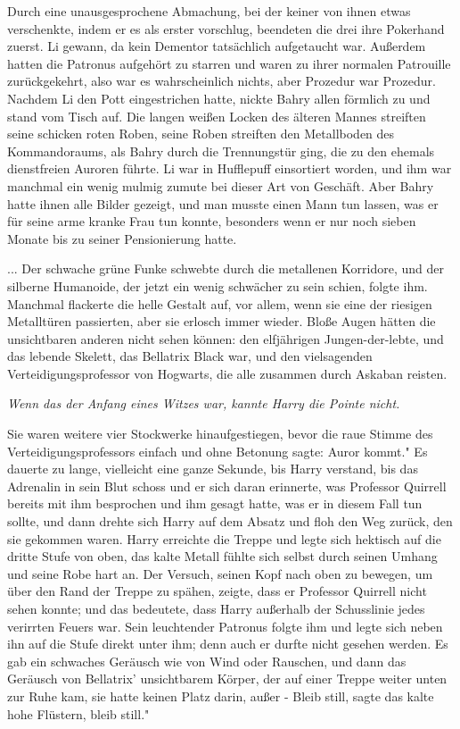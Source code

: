 Durch eine unausgesprochene Abmachung, bei der keiner von ihnen etwas
verschenkte, indem er es als erster vorschlug, beendeten die drei ihre Pokerhand
zuerst. Li gewann, da kein Dementor tatsächlich aufgetaucht war. Außerdem hatten
die Patronus aufgehört zu starren und waren zu ihrer normalen Patrouille
zurückgekehrt, also war es wahrscheinlich nichts, aber Prozedur war Prozedur.
Nachdem Li den Pott eingestrichen hatte, nickte Bahry allen förmlich zu und
stand vom Tisch auf. Die langen weißen Locken des älteren Mannes streiften seine
schicken roten Roben, seine Roben streiften den Metallboden des Kommandoraums,
als Bahry durch die Trennungstür ging, die zu den ehemals dienstfreien Auroren
führte. Li war in Hufflepuff einsortiert worden, und ihm war manchmal ein wenig
mulmig zumute bei dieser Art von Geschäft. Aber Bahry hatte ihnen alle Bilder
gezeigt, und man musste einen Mann tun lassen, was er für seine arme kranke Frau
tun konnte, besonders wenn er nur noch sieben Monate bis zu seiner Pensionierung
hatte.

... Der schwache grüne Funke schwebte durch die metallenen Korridore, und der
silberne Humanoide, der jetzt ein wenig schwächer zu sein schien, folgte ihm.
Manchmal flackerte die helle Gestalt auf, vor allem, wenn sie eine der riesigen
Metalltüren passierten, aber sie erlosch immer wieder. Bloße Augen hätten die
unsichtbaren anderen nicht sehen können: den elfjährigen Jungen-der-lebte, und
das lebende Skelett, das Bellatrix Black war, und den vielsagenden
Verteidigungsprofessor von Hogwarts, die alle zusammen durch Askaban reisten.

\emph{Wenn das der Anfang eines Witzes war, kannte Harry die Pointe nicht.}

Sie waren weitere vier Stockwerke hinaufgestiegen, bevor die raue Stimme des
Verteidigungsprofessors einfach und ohne Betonung sagte: \glqq{}Auror kommt." Es
dauerte zu lange, vielleicht eine ganze Sekunde, bis Harry verstand, bis das
Adrenalin in sein Blut schoss und er sich daran erinnerte, was Professor
Quirrell bereits mit ihm besprochen und ihm gesagt hatte, was er in diesem Fall
tun sollte, und dann drehte sich Harry auf dem Absatz und floh den Weg zurück,
den sie gekommen waren. Harry erreichte die Treppe und legte sich hektisch auf
die dritte Stufe von oben, das kalte Metall fühlte sich selbst durch seinen
Umhang und seine Robe hart an. Der Versuch, seinen Kopf nach oben zu bewegen, um
über den Rand der Treppe zu spähen, zeigte, dass er Professor Quirrell nicht
sehen konnte; und das bedeutete, dass Harry außerhalb der Schusslinie jedes
verirrten Feuers war. Sein leuchtender Patronus folgte ihm und legte sich neben
ihn auf die Stufe direkt unter ihm; denn auch er durfte nicht gesehen werden. Es
gab ein schwaches Geräusch wie von Wind oder Rauschen, und dann das Geräusch von
Bellatrix' unsichtbarem Körper, der auf einer Treppe weiter unten zur Ruhe kam,
sie hatte keinen Platz darin, außer - \glqq{}Bleib still\grqq{}, sagte das kalte
hohe Flüstern, \glqq{}bleib still."

